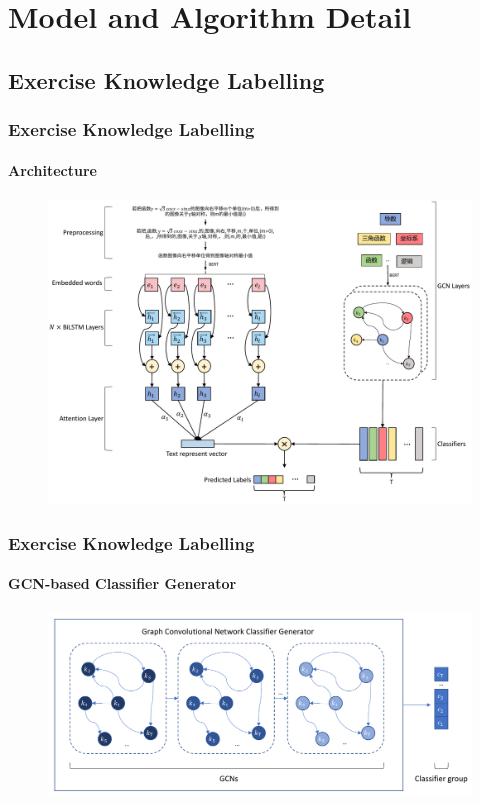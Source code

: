 \documentclass[10pt,aspectratio=43,mathserif]{beamer}
\begin{document}
\section{Model and Algorithm Detail}
\subsection{Exercise Knowledge Labelling}
\begin{frame}
	\frametitle{Exercise Knowledge Labelling}
	\framesubtitle{Architecture}
	\begin{figure}
		\centering
		\includegraphics[height=0.80\textheight]{figures/ch2-ov.pdf}
	\end{figure}
\end{frame}

\begin{frame}
	\frametitle{Exercise Knowledge Labelling}
	\framesubtitle{GCN-based Classifier Generator}
	\begin{figure}
		\centering
		\includegraphics[width=1.0\textwidth]{figures/ch2-gcnclsgen-model.pdf}
	\end{figure}
\end{frame}
\end{document}
